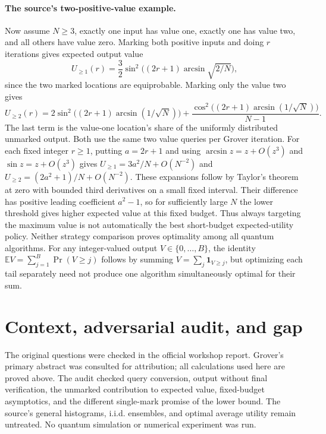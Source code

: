 \documentclass[11pt]{article}
\begin{document}
\paragraph{The source's two-positive-value example.}
Now assume $N\ge3$, exactly one input has value one, exactly one has value
two, and all others have value zero. Marking both positive inputs and doing
$r$ iterations gives expected output value
\[
U_{\ge1}(r)=\frac32\sin^2\bigl((2r+1)\arcsin\sqrt{2/N}\bigr),
\]
since the two marked locations are equiprobable. Marking only the value two
gives
\[
U_{\ge2}(r)=2\sin^2\bigl((2r+1)\arcsin(1/\sqrt N)\bigr)
+\frac{\cos^2\bigl((2r+1)\arcsin(1/\sqrt N)\bigr)}{N-1}.
\]
The last term is the value-one location's share of the uniformly distributed
unmarked output. Both use the same two value queries per Grover iteration.
For each fixed integer $r\ge1$, putting $a=2r+1$ and using
$\arcsin z=z+O(z^3)$ and $\sin z=z+O(z^3)$ gives
$U_{\ge1}=3a^2/N+O(N^{-2})$ and
$U_{\ge2}=(2a^2+1)/N+O(N^{-2})$.
These expansions follow by Taylor's theorem at zero with bounded third
derivatives on a small fixed interval. Their difference has positive leading
coefficient $a^2-1$, so for sufficiently large $N$ the lower threshold gives
higher expected value at this fixed budget. Thus always targeting the maximum
value is not automatically the best short-budget expected-utility policy.
Neither strategy comparison proves optimality among all quantum algorithms.
For any integer-valued output $V\in\{0,\ldots,B\}$, the identity
$\mathbb E V=\sum_{j=1}^B\Pr(V\ge j)$ follows by summing
$V=\sum_j\mathbf1_{V\ge j}$, but optimizing each tail separately need not
produce one algorithm simultaneously optimal for their sum.

\section{Context, adversarial audit, and gap}
The original questions were checked in the official workshop report. Grover's
primary abstract was consulted for attribution; all calculations used here
are proved above. The audit checked query conversion, output without final
verification, the unmarked contribution to expected value, fixed-budget
asymptotics, and the different single-mark promise of the lower bound. The
source's general histograms, i.i.d. ensembles, and optimal average utility
remain untreated. No quantum simulation or numerical experiment was run.
\end{document}
